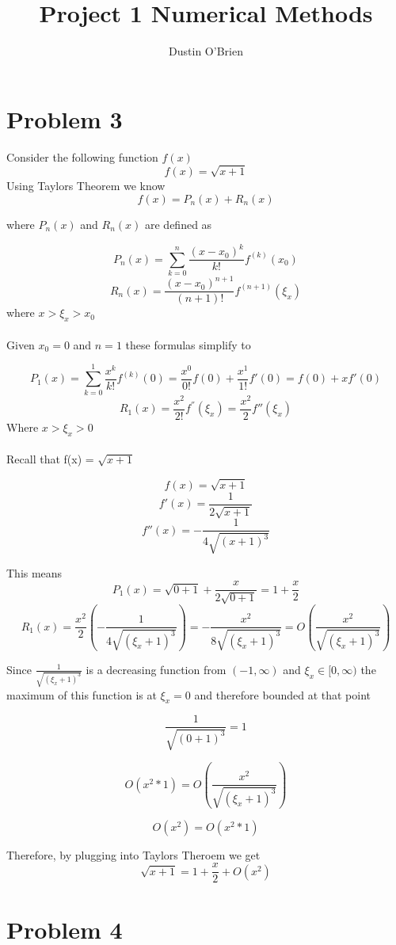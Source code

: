 \documentclass[]{article}
\title{Project 1 Numerical Methods}
\author{Dustin O'Brien}
\begin{document}
\maketitle


\section*{Problem 3}
Consider the following function $f(x)$
\[ f(x) = \sqrt{x + 1} \]
Using Taylors Theorem we know
\[f(x) = P_n(x) + R_n(x)\]

where $P_n(x)$ and $R_n(x)$ are defined as

\[P_n(x) = \sum_{k=0}^{n} \frac{(x-x_0)^k}{k!} f^{(k)}(x_0)\]
\[R_n(x) = \frac{(x - x_0)^{n+1}}{(n+1)!} f^{(n+1)}(\xi_x)\]
where $ x> \xi_x >x_0$ \\\\
Given $x_0 = 0$ and $n = 1$ these formulas simplify to

\[P_1(x) = \sum_{k=0}^{1} \frac{x^k}{k!} f^{(k)}(0) = \frac{x^0}{0!} f(0) + \frac{x^{1}}{1!}f'(0) = f(0) + xf'(0)\]
\[R_1(x) = \frac{x^{2}}{2!} f^{''}(\xi_x) = \frac{x^{2}}{2}f''(\xi_x)\]
Where $x > \xi_x > 0$
\\\\
Recall that f(x) = $\sqrt{x+1}$


\[	f(x) = \sqrt{x+1} \]
\[	f'(x) = \frac{1}{2\sqrt{x+1}} \]
\[	f''(x) = -\frac{1}{4\sqrt{(x+1)^3}} \]

This means
\[ P_1(x) = \sqrt{0 + 1} + \frac{x}{2\sqrt{0+1}} = 1 + \frac{x}{2}\]
\[R_1(x) = \frac{x^2}{2} (-\frac{1}{4\sqrt{(\xi_x+1)^3}}) = -\frac{x^2}{8\sqrt{(\xi_x+1)^3}} = O(\frac{x^2}{\sqrt{(\xi_x +1)^3}})\]

Since $\frac{1}{\sqrt{(\xi_x + 1)^3}}$ is a decreasing function from $(-1, \infty)$ and $\xi_x \in [0, \infty)$ the maximum of this function is at $\xi_x = 0$ and therefore bounded at that point

\[\frac{1}{\sqrt{(0 + 1)^3}} = 1 \]

\[O(x^2 * 1) = O(\frac{x^2}{\sqrt{(\xi_x +1)^3}})\]

\[O(x^2) = O(x^2 * 1)\]

Therefore, by plugging into Taylors Theroem we get
\[\sqrt{x+1} = 1 + \frac{x}{2}+O(x^2)\]



\section*{Problem 4}
\end{document}
